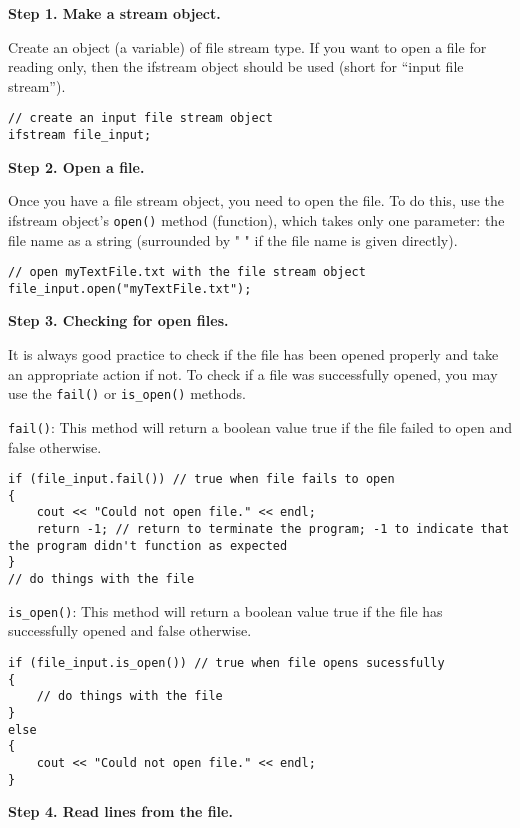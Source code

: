 \textbf{Step 1. Make a stream object.}

Create an object (a variable) of file stream type. If you want to open a file for reading only, then the ifstream object should be used (short for “input file stream”).

\begin{verbatim}
// create an input file stream object
ifstream file_input;
\end{verbatim}

\textbf{Step 2. Open a file.}

Once you have a file stream object, you need to open the file. To do this, use the ifstream object's \texttt{open()} method (function), which takes only one parameter: the file name as a string (surrounded by " " if the file name is given directly).

\begin{verbatim}
// open myTextFile.txt with the file stream object
file_input.open("myTextFile.txt");
\end{verbatim}
  
\textbf{Step 3. Checking for open files.}

It is always good practice to check if the file has been opened properly and take an appropriate action if not. To check if a file was successfully opened, you may use the \texttt{fail()} or \texttt{is_open()} methods.

\texttt{fail()}: This method will return a boolean value true if the file failed to open and false otherwise.

\begin{verbatim}
if (file_input.fail()) // true when file fails to open
{
    cout << "Could not open file." << endl; 
    return -1; // return to terminate the program; -1 to indicate that the program didn't function as expected
}
// do things with the file
\end{verbatim}

\texttt{is_open()}: This method will return a boolean value true if the file has successfully opened and false otherwise.

\begin{verbatim}
if (file_input.is_open()) // true when file opens sucessfully
{
    // do things with the file
}
else
{
    cout << "Could not open file." << endl;        
}
\end{verbatim}

\textbf{Step 4. Read lines from the file.}

